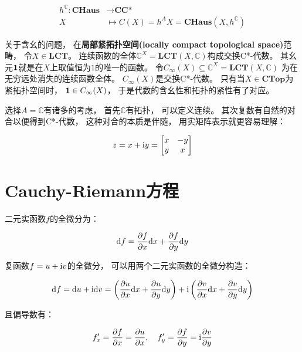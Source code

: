\documentclass[10pt, openany]{book}
\begin{document}
$$
\begin{aligned}
  h^\mathbb C: \textbf{CHaus} &\to \textbf{CC*} \\
  X &\mapsto C(X) = h^A X = \textbf{CHaus}(X,h^\mathbb C)
\end{aligned}
$$

关于含幺的问题，
在\textbf{局部紧拓扑空间(locally compact topological space)}范畴，
令$X\in\textbf{LCT}$。
连续函数的全体$\mathbb C^X = \textbf{LCT}(X,\mathbb C)$构成交换C*-代数。
其幺元$\textbf 1$就是在$X$上取值恒为$1$的唯一的函数。
令$C_\infty(X) \subseteq \mathbb C^X = \textbf{LCT}(X,\mathbb C)$
为在无穷远处消失的连续函数全体。
$C_\infty(X)$是交换C*-代数。
只有当$X\in\textbf{CTop}$为紧拓扑空间时，
$\textbf 1 \in C_\infty(X)$，
于是代数的含幺性和拓扑的紧性有了对应。

选择$A = \mathbb C$有诸多的考虑，
首先$\mathbb C$有拓扑，
可以定义连续。
其次复数有自然的对合以便得到C*-代数，
这种对合的本质是伴随，
用实矩阵表示就更容易理解：

$$
z = x + \text i y
=\begin{bmatrix}
  x & -y \\
  y & x
\end{bmatrix}
$$

\section{Cauchy-Riemann方程}

二元实函数$f$的全微分为：

\begin{equation}
\text d f = \dfrac{\partial f}{\partial x} \text d x
+ \dfrac{\partial f}{\partial y}  \text d y
\end{equation}
\label{eq:real-total-differencial}

复函数$f = u + \text i v$的全微分，
可以用两个二元实函数的全微分构造：

\begin{equation}
\text d f 
= \text d u + \text i \text d v
= \left( \dfrac{\partial u}{\partial x} \text d x
+ \dfrac{\partial u}{\partial y}  \text d y \right)
+ \text i \left( \dfrac{\partial v}{\partial x} \text d x
+ \dfrac{\partial v}{\partial y}  \text d y \right)
\end{equation}
\label{eq:combo-total-differencial}

且偏导数有：

$$
f^\prime_x = \dfrac{\partial f}{\partial x} = \dfrac{\partial u}{\partial x}, \quad
f^\prime_y = \dfrac{\partial f}{\partial y} = \text i \dfrac{\partial v}{\partial y}
$$
\end{document}
